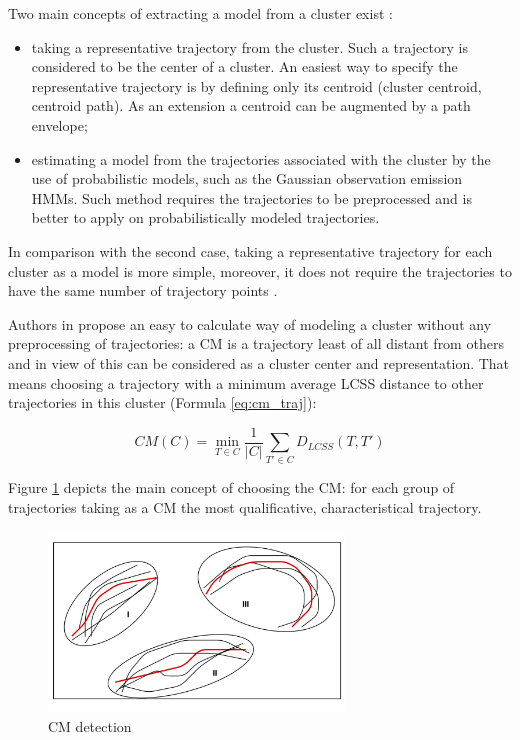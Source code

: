 Two main concepts of extracting a model from a cluster exist \cite{article:surv_cl_models}:

\begin{itemize}
	\setlength\itemsep{0em}
	\item taking a representative trajectory from the cluster. Such a trajectory is considered to be the center of a cluster. An easiest way to specify the representative trajectory is by defining only its centroid (cluster centroid, centroid path). As an extension a centroid can be augmented by a path envelope;
	\item estimating a model from the trajectories associated with the cluster by the use of probabilistic models, such as the Gaussian observation emission HMMs. Such method requires the trajectories to be preprocessed and is better to apply on probabilistically modeled trajectories.
\end{itemize}

In comparison with the second case, taking a representative trajectory for each cluster as a model is more simple, moreover, it does not require the trajectories to have the same number of trajectory points \cite{inproceedings:7_related_work}.

Authors in \cite{inproceedings:7_related_work} propose an easy to calculate way of modeling a cluster without any preprocessing of trajectories: a CM is a trajectory least of all distant from others and in view of this can be considered as a cluster center and representation. That means choosing a trajectory with a minimum average LCSS distance to other trajectories in this cluster (Formula \ref{eq:cm_traj}):

\begin{equation} \label{eq:cm_traj}
	CM(C) = \min\limits_{T \in C} \frac{1}{|C|} \sum_{T' \in C} D_{LCSS}(T, T')
\end{equation}

Figure \ref{fig:cm-modeling} depicts the main concept of choosing the CM: for each group of trajectories taking as a CM the most qualificative, characteristical trajectory.

\begin{figure}[!htb]
	\centering{}
	\includegraphics[width=0.7\textwidth]{images/cm-modeling.png}
	\caption{CM detection}
	\label{fig:cm-modeling}
\end{figure}

